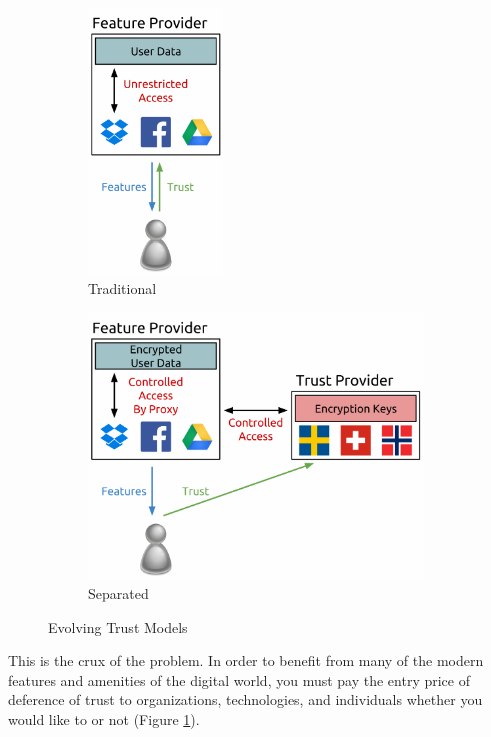 \begin{figure}[!tb]
  \vspace{5ex}
  \begin{center}
    \begin{subfigure}{.32\textwidth}
      \begin{center}
        \includegraphics[height=200pt]{./figs/pdf/TrustModel-Traditional.pdf}
        \caption{Traditional}
        \label{fig:trust-traditional}
      \end{center}
    \end{subfigure}
    \begin{subfigure}{.65\textwidth}
      \begin{center}
        \includegraphics[height=200pt]{./figs/pdf/TrustModel-Seperated.pdf}
        \caption{Separated}
        \label{fig:trust-seperated}
      \end{center}
    \end{subfigure}
  \end{center}
  \caption{Evolving Trust Models}
  \label{fig:trust}
\end{figure}

This is the crux of the problem. In order to benefit from many of the
modern features and amenities of the digital world, you must pay the
entry price of deference of trust to organizations, technologies, and
individuals whether you would like to or not (Figure
\ref{fig:trust-traditional}).

